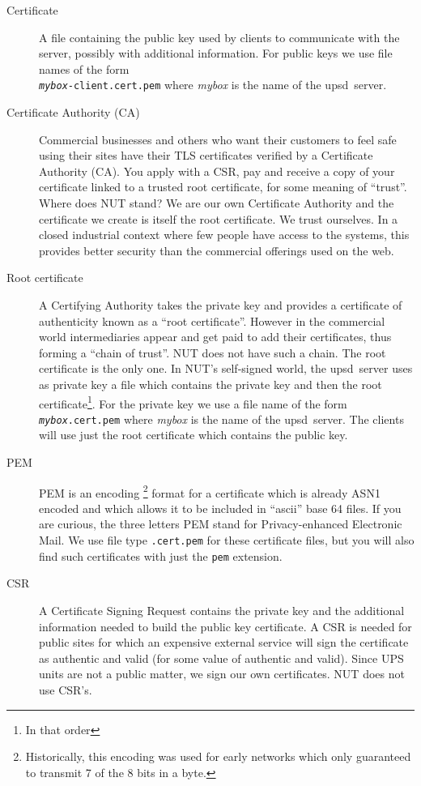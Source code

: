\documentclass[12pt]{article}
\newcommand{\upsd}{\mbox{\textcolor{UPSDCOLOUR}{upsd}}}
\begin{document}
\begin{description}

\item[Certificate] A file containing the public key used by clients to
  communicate with the server, possibly with additional information.  For
  public keys we use file names of the form \\ 
  \texttt{\textit{mybox}-client.cert.pem} where \textit{mybox} is the name
  of the \upsd\ server.
  
\item[Certificate Authority (CA)] Commercial businesses and others who want
  their customers to feel safe using their sites have their TLS certificates
  verified by a Certificate Authority (CA). You apply with a CSR, pay and
  receive a copy of your certificate linked to a trusted root certificate, for
  some meaning of ``trust''.  Where does NUT stand?  We are our own
  Certificate Authority and the certificate we create is itself the root
  certificate.  We trust ourselves.  In a closed industrial context where few
  people have access to the systems, this provides better security than the
  commercial offerings used on the web.
  
\item[Root certificate] A Certifying Authority takes the private key and
  provides a certificate of authenticity known as a ``root certificate''.
  However in the commercial world intermediaries appear and get paid to add
  their certificates, thus forming a ``chain of trust''.  NUT does not have
  such a chain.  The root certificate is the only one.  In NUT's self-signed
  world, the \upsd\ server uses as private key a file which contains the
  private key and then the root certificate\footnote{In that order}.  For the
  private key we use a file name of the form \texttt{\textit{mybox}.cert.pem}
  where \textit{mybox} is the name of the \upsd\ server.  The clients will use
  just the root certificate which contains the public key.

\item[PEM] PEM is an encoding \footnote{Historically, this encoding was used
  for early networks which only guaranteed to transmit 7 of the 8 bits in a
  byte.}  format for a certificate which is already ASN1 encoded and which
  allows it to be included in ``ascii'' base 64 files.  If you are curious,
  the three letters PEM stand for Privacy-enhanced Electronic Mail.  We use
  file type \texttt{.cert.pem} for these certificate files, but you will also
  find such certificates with just the \texttt{pem} extension.

\item[CSR] A Certificate Signing Request contains the private key and the
  additional information needed to build the public key certificate.  A CSR is
  needed for public sites for which an expensive external service will sign
  the certificate as authentic and valid (for some value of authentic and
  valid).  Since UPS units are not a public matter, we sign our own
  certificates.  NUT does not use CSR's.

\end{description}
\end{document}
